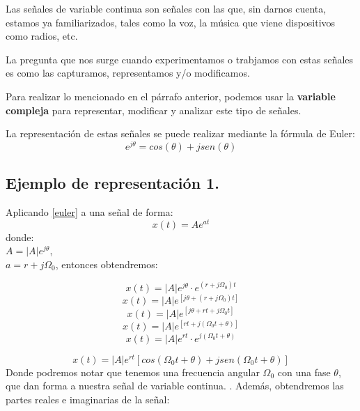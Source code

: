 
Las señales de variable continua son señales con las que, sin darnos cuenta, estamos ya familiarizados, tales como la voz, la música que viene dispositivos como radios, etc. \cite{chaparro_signals_2010}

La pregunta que nos surge cuando experimentamos o trabjamos con estas señales es como las capturamos, representamos y/o modificamos.

Para realizar lo mencionado en el párrafo anterior, podemos usar la \textbf{variable compleja} para representar, modificar y analizar este tipo de señales.

La representación de estas señales se puede realizar mediante la fórmula de Euler:
\begin{equation}
    e^{j\theta} = cos(\theta)+jsen(\theta)
    \label{euler}
\end{equation}

\subsection{Ejemplo de representación 1.}
Aplicando  \ref{euler} a una señal de forma:
\begin{equation*}
    x(t) = Ae^{at}
\end{equation*}
donde:\\
$A = |A|e^{j\theta}$,\\
$a = r+j\Omega_0$,
entonces obtendremos:

\begin{equation*}
    x(t) = |A|e^{j\theta} \cdot e^{(r+j\Omega_0)t}
\end{equation*}
\begin{equation*}
    x(t) = |A|e^{[j\theta + (r+j\Omega_0)t]}
\end{equation*}
\begin{equation*}
    x(t) = |A|e^{[j\theta+rt+j\Omega_0 t]}
\end{equation*}
\begin{equation*}
    x(t) = |A|e^{[rt+j(\Omega_0 t+\theta)]}
\end{equation*}
\begin{equation*}
    x(t) = |A|e^{rt}\cdot e^{j(\Omega_0 t +\theta)}
\end{equation*}

\begin{equation}
    x(t) = |A|e^{rt} [cos(\Omega_0 t +\theta)+jsen(\Omega_0 t +\theta)]
\end{equation}
Donde podremos notar que tenemos una frecuencia angular $\Omega_0$ con una fase $\theta$, que dan forma a nuestra señal de variable continua. \cite{tarrio_ondas_nodate}.
Además, obtendremos las partes reales e imaginarias de la señal:

